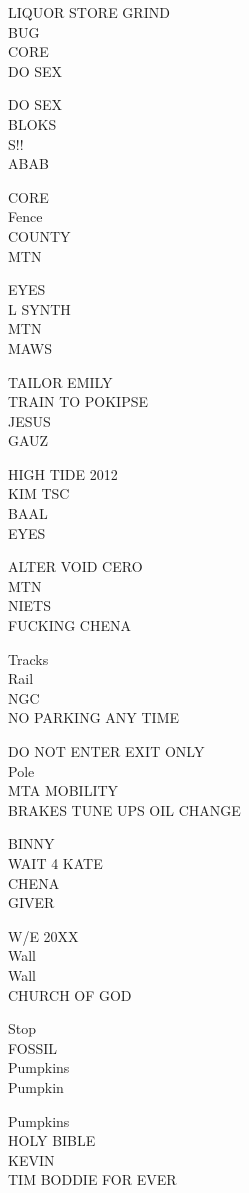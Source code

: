 \documentclass[10pt,letterpaper]{article}
\begin{document}
LIQUOR STORE GRIND\\
BUG\\
CORE\\
DO SEX

DO SEX\\
BLOKS\\
S!!\\
ABAB

CORE\\
Fence\\
COUNTY\\
MTN

EYES\\
L SYNTH\\
MTN\\
MAWS

TAILOR EMILY\\
TRAIN TO POKIPSE\\
JESUS\\
GAUZ

HIGH TIDE 2012\\
KIM TSC\\
BAAL\\
EYES

ALTER VOID CERO\\
MTN\\
NIETS\\
FUCKING CHENA

Tracks\\
Rail\\
NGC\\
NO PARKING ANY TIME

DO NOT ENTER EXIT ONLY\\
Pole\\
MTA MOBILITY\\
BRAKES TUNE UPS OIL CHANGE

BINNY\\
WAIT 4 KATE\\
CHENA\\
GIVER

W/E 20XX\\
Wall\\
Wall\\
CHURCH OF GOD

Stop\\
FOSSIL\\
Pumpkins\\
Pumpkin

Pumpkins\\
HOLY BIBLE\\
KEVIN\\
TIM BODDIE FOR EVER
\end{document}
